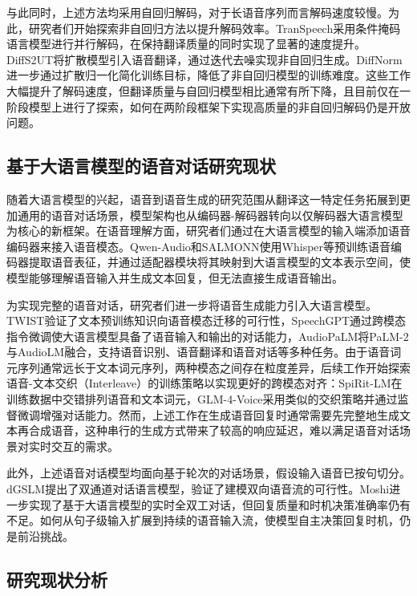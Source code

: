 与此同时，上述方法均采用自回归解码，对于长语音序列而言解码速度较慢。为此，研究者们开始探索非自回归方法以提升解码效率。TranSpeech\citep{huang2023transpeech}采用条件掩码语言模型进行并行解码，在保持翻译质量的同时实现了显著的速度提升。DiffS2UT\citep{diffs2ut}将扩散模型引入语音翻译，通过迭代去噪实现非自回归生成。DiffNorm\citep{tan2024diffnorm}进一步通过扩散归一化简化训练目标，降低了非自回归模型的训练难度。这些工作大幅提升了解码速度，但翻译质量与自回归模型相比通常有所下降，且目前仅在一阶段模型上进行了探索，如何在两阶段框架下实现高质量的非自回归解码仍是开放问题。

\subsection{基于大语言模型的语音对话研究现状}

随着大语言模型的兴起，语音到语音生成的研究范围从翻译这一特定任务拓展到更加通用的语音对话场景，模型架构也从编码器-解码器转向以仅解码器大语言模型为核心的新框架。在语音理解方面，研究者们通过在大语言模型的输入端添加语音编码器来接入语音模态。Qwen-Audio\citep{Qwen-Audio}和SALMONN\citep{tang2024salmonn}使用Whisper\citep{whisper}等预训练语音编码器提取语音表征，并通过适配器模块将其映射到大语言模型的文本表示空间，使模型能够理解语音输入并生成文本回复，但无法直接生成语音输出。

为实现完整的语音对话，研究者们进一步将语音生成能力引入大语言模型。TWIST\citep{twist}验证了文本预训练知识向语音模态迁移的可行性，SpeechGPT\citep{zhang-etal-2023-speechgpt}通过跨模态指令微调使大语言模型具备了语音输入和输出的对话能力，AudioPaLM\citep{rubenstein2023audiopalm}将PaLM-2与AudioLM融合，支持语音识别、语音翻译和语音对话等多种任务。由于语音词元序列通常远长于文本词元序列，两种模态之间存在粒度差异，后续工作开始探索语音-文本交织（Interleave）的训练策略以实现更好的跨模态对齐：SpiRit-LM\citep{nguyen2024spirit}在训练数据中交错排列语音和文本词元，GLM-4-Voice\citep{glm4voice}采用类似的交织策略并通过监督微调增强对话能力。然而，上述工作在生成语音回复时通常需要先完整地生成文本再合成语音，这种串行的生成方式带来了较高的响应延迟，难以满足语音对话场景对实时交互的需求。

此外，上述语音对话模型均面向基于轮次的对话场景，假设输入语音已按句切分。dGSLM\citep{nguyen2022dgslm}提出了双通道对话语言模型，验证了建模双向语音流的可行性。Moshi\citep{kyutai2024moshi}进一步实现了基于大语言模型的实时全双工对话，但回复质量和时机决策准确率仍有不足。如何从句子级输入扩展到持续的语音输入流，使模型自主决策回复时机，仍是前沿挑战。

\subsection{研究现状分析}

